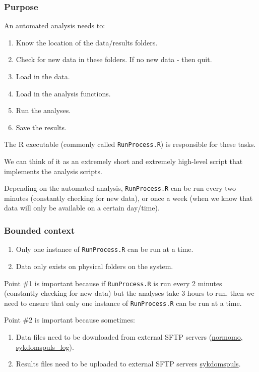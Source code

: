\documentclass[12pt,]{article}
\providecommand{\tightlist}{%
  \setlength{\itemsep}{0pt}\setlength{\parskip}{0pt}}
\begin{document}
\subsubsection{Purpose}\label{purpose}

An automated analysis needs to:

\begin{enumerate}
\def\labelenumi{\arabic{enumi}.}
\tightlist
\item
  Know the location of the data/results folders.
\item
  Check for new data in these folders. If no new data - then quit.
\item
  Load in the data.
\item
  Load in the analysis functions.
\item
  Run the analyses.
\item
  Save the results.
\end{enumerate}

The R executable (commonly called \texttt{RunProcess.R}) is responsible
for these tasks.

We can think of it as an extremely short and extremely high-level script
that implements the analysis scripts.

Depending on the automated analysis, \texttt{RunProcess.R} can be run
every two minutes (constantly checking for new data), or once a week
(when we know that data will only be available on a certain day/time).

\subsubsection{Bounded context}\label{bounded-context}

\begin{enumerate}
\def\labelenumi{\arabic{enumi}.}
\tightlist
\item
  Only one instance of \texttt{RunProcess.R} can be run at a time.
\item
  Data only exists on physical folders on the system.
\end{enumerate}

Point \#1 is important because if \texttt{RunProcess.R} is run every 2
minutes (constantly checking for new data) but the analyses take 3 hours
to run, then we need to ensure that only one instance of
\texttt{RunProcess.R} can be run at a time.

Point \#2 is important because sometimes:

\begin{enumerate}
\def\labelenumi{\arabic{enumi}.}
\tightlist
\item
  Data files need to be downloaded from external SFTP servers
  (\href{https://folkehelseinstituttet.github.io/dashboards_normomo/}{normomo},
  \href{https://folkehelseinstituttet.github.io/dashboards_sykdomspuls_log/}{sykdomspuls\_log}).
\item
  Results files need to be uploaded to external SFTP servers
  \href{https://folkehelseinstituttet.github.io/dashboards_sykdomspuls/}{sykdomspuls}.
\end{enumerate}
\end{document}
